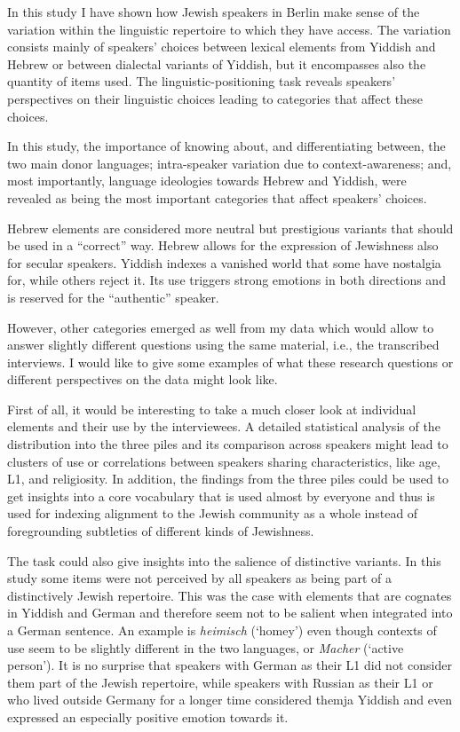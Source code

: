 \documentclass[output=paper]{langscibook}
\begin{document}
In this study I have shown how Jewish speakers in Berlin make sense of the variation within the linguistic repertoire to which they have access. The variation consists mainly of speakers’ choices between lexical elements from Yiddish and Hebrew or between dialectal variants of Yiddish, but it encompasses also the quantity of items used. The linguistic-positioning task reveals speakers’ perspectives on their linguistic choices leading to categories that affect these choices.

In this study, the importance of knowing about, and differentiating between, the two main donor languages; intra-speaker variation due to context-awareness; and, most importantly, language ideologies towards Hebrew and Yiddish, were revealed as being the most important categories that affect speakers' choices.

Hebrew elements are considered more neutral but prestigious variants that should be used in a “correct” way. Hebrew allows for the expression of Jewishness also for secular speakers. Yiddish indexes a vanished world that some have nostalgia for, while others reject it. Its use triggers strong emotions in both directions and is reserved for the “authentic” speaker.

However, other categories emerged as well from my data which would allow to answer slightly different questions using the same material, i.e., the transcribed interviews. I would like to give some examples of what these research questions or different perspectives on the data might look like.

First of all, it would be interesting to take a much closer look at individual elements and their use by the interviewees. A detailed statistical analysis of the distribution into the three piles and its comparison across speakers might lead to clusters of use or correlations between speakers sharing characteristics, like age, L1, and religiosity. In addition, the findings from the three piles could be used to get insights into a core vocabulary that is used almost by everyone and thus is used for indexing alignment to the Jewish community as a whole instead of foregrounding subtleties of different kinds of Jewishness.

The task could also give insights into the salience of distinctive variants. In this study some items were not perceived by all speakers as being part of a distinctively Jewish repertoire. This was the case with elements that are cognates in Yiddish and German and therefore seem not to be salient when integrated into a German sentence. An example is \textit{heimisch} (‘homey’) even though contexts of use seem to be slightly different in the two languages, or \textit{Macher} (‘active person’). It is no surprise that speakers with German as their L1 did not consider them part of the Jewish repertoire, while speakers with Russian as their L1 or who lived outside Germany for a longer time considered themja Yiddish and even expressed an especially positive emotion towards it.
\end{document}
